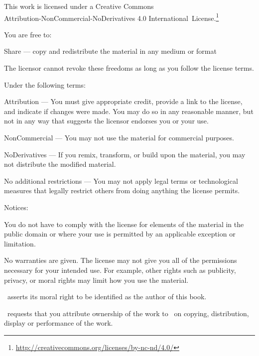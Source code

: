 \cleartorecto
\thispagestyle{chapter}
{\copyrightsize\setlength{\parindent}{0pt}%
\raggedright\label{copyright-details}
\setlength{\parskip}{7pt}

{\centering

{\LARGE\ccbyncnd}

This work is licensed under a Creative Commons\\
Attribution-NonCommercial-NoDerivatives 4.0 International~License.\footnote{%
\href{http://creativecommons.org/licenses/by-nc-nd/4.0/}{http://creativecommons.org/licenses/by-nc-nd/4.0/}}

}

You are free to:

\begin{packeditemize}
\item Share — copy and redistribute the material in any medium or format
\end{packeditemize}

The licensor cannot revoke these freedoms as long as you follow the license terms.

Under the following terms:

\begin{packeditemize}
\item Attribution — You must give appropriate credit, provide a link to the license, and indicate if changes were made. You may do so in any reasonable manner, but not in any way that suggests the licensor endorses you or your use.
\item NonCommercial — You may not use the material for commercial purposes.
\item NoDerivatives — If you remix, transform, or build upon the material, you may not distribute the modified material.
\end{packeditemize}

No additional restrictions — You may not apply legal terms or technological measures that legally restrict others from doing anything the license permits.

Notices:

You do not have to comply with the license for elements of the material in the public domain or where your use is permitted by an applicable exception or limitation.

No warranties are given. The license may not give you all of the permissions necessary for your intended use. For example, other rights such as publicity, privacy, or moral rights may limit how you use the material.


\thePublisher\ asserts its moral right to be identified as the author of this book.

\thePublisher\ requests that you attribute ownership of the work to \thePublisher\ on copying, distribution, display or performance of the work.

}
